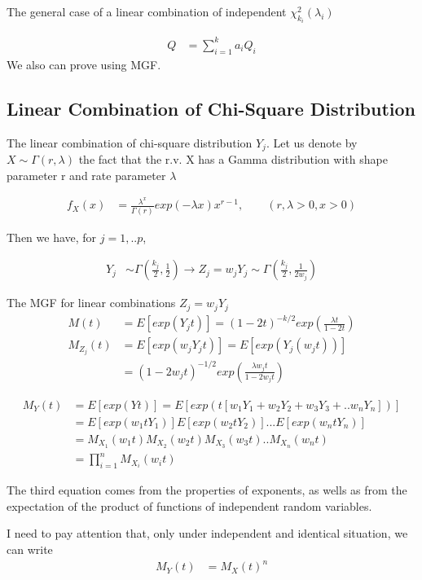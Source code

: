 \documentclass[11pt]{article} %
\begin{document}
The general case of a linear combination of independent $\chi^2_{k_i}(\lambda_i)$

\begin{align*}
	Q &= \sum_{i=1}^k a_i Q_i
\end{align*}
We also can prove using MGF.

\subsection{Linear Combination of Chi-Square Distribution}
The linear combination of chi-square distribution $Y_j$. Let us denote by $X \sim \Gamma(r, \lambda)$ the fact that the r.v. X has a Gamma distribution with shape parameter r and rate parameter $\lambda$ 

\begin{align*}
	f_{X}(x) &= \frac{\lambda^x}{\Gamma (r)} exp(- \lambda x) x^{r-1}, \qquad (r, \lambda >0, x >0)
\end{align*}

Then we have, for $j=1,..p$,

\begin{align*}
	Y_j & \sim  \Gamma(\frac{k_j}{2}, \frac{1}{2}) \rightarrow Z_j = w_j Y_j \sim \Gamma(\frac{k_j}{2}, \frac{1}{2w_j})
\end{align*}

The MGF for linear combinations $Z_j = w_j Y_j$
\begin{align*}
	M(t) &= E[exp(Y_j t)] = (1-2t)^{-k/2} exp \left( \frac{ \lambda t }{1-2t} \right)\\
	M_{Z_j} (t) & = E[exp(w_j Y_j t)] = E[exp( Y_j (w_jt))] \\
	&= (1-2 w_jt)^{-1/2} exp \left( \frac{ \lambda w_j t }{1-2 w_j t} \right)
\end{align*}

\begin{align*}
	M_Y(t) &= E[exp(Y t)] = E[exp(t [w_1 Y_1 + w_2 Y_2 + w_3 Y_3 +.. w_n Y_n])]\\
	&= E[exp(w_1 t Y_1)]E[exp(w_2 t Y_2)]... E[exp(w_n t Y_n)]\\
	&= M_{X_1}(w_1 t) M_{X_2}(w_2 t) M_{X_3}(w_3 t).. M_{X_n}(w_n t)\\
	&= \prod_{i=1}^n M_{X_i}(w_i t)
\end{align*}

The third equation comes from the properties of exponents, as wells as from the expectation of the product of functions of independent random variables. 

I need to pay attention that, only under independent and identical situation, we can write
 \begin{align*}
 	M_Y(t) &= M_{X}(t)^n
 \end{align*}
\end{document}
